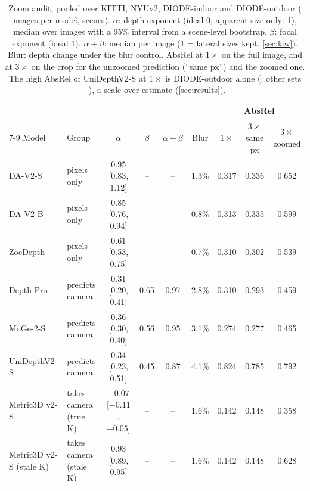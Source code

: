 \begin{table}[t]\centering\small
\caption{Zoom audit, pooled over KITTI, NYUv2, DIODE-indoor and DIODE-outdoor (\nImages{} images per model, \nScenes{} scenes). $\alpha$: depth exponent (ideal 0; apparent size only: 1), median over images with a 95\% interval from a scene-level bootstrap. $\beta$: focal exponent (ideal 1). $\alpha+\beta$: median per image (1 = lateral sizes kept, \cref{sec:law}). Blur: depth change under the blur control. AbsRel at $1\times$ on the full image, and at $3\times$ on the crop for the unzoomed prediction (``same px'') and the zoomed one. The high AbsRel of UniDepthV2-S at $1\times$ is DIODE-outdoor alone (\udDiodeOutAbsrelOne; other sets \udNyuAbsrelOne--\udDiodeInAbsrelOne), a scale over-estimate (\cref{sec:results}).}
\label{tab:audit}
\setlength{\tabcolsep}{4pt}
\begin{tabular}{llccccccc}\toprule
& & & & & & \multicolumn{3}{c}{AbsRel} \\ \cmidrule(lr){7-9}
Model & Group & $\alpha$ & $\beta$ & $\alpha+\beta$ & Blur & $1\times$ & $3\times$ same px & $3\times$ zoomed \\ \midrule
DA-V2-S & pixels only & 0.95 [0.83, 1.12] & -- & -- & 1.3\% & 0.317 & 0.336 & 0.652 \\
DA-V2-B & pixels only & 0.85 [0.76, 0.94] & -- & -- & 0.8\% & 0.313 & 0.335 & 0.599 \\
ZoeDepth & pixels only & 0.61 [0.53, 0.75] & -- & -- & 0.7\% & 0.310 & 0.302 & 0.539 \\
Depth Pro & predicts camera & 0.31 [0.20, 0.41] & 0.65 & 0.97 & 2.8\% & 0.310 & 0.293 & 0.459 \\
MoGe-2-S & predicts camera & 0.36 [0.30, 0.40] & 0.56 & 0.95 & 3.1\% & 0.274 & 0.277 & 0.465 \\
UniDepthV2-S & predicts camera & 0.34 [0.23, 0.51] & 0.45 & 0.87 & 4.1\% & 0.824 & 0.785 & 0.792 \\
Metric3D v2-S & takes camera (true K) & \ensuremath{-0.07} [\ensuremath{-0.11}, \ensuremath{-0.05}] & -- & -- & 1.6\% & 0.142 & 0.148 & 0.358 \\
Metric3D v2-S (stale K) & takes camera (stale K) & 0.93 [0.89, 0.95] & -- & -- & 1.6\% & 0.142 & 0.148 & 0.628 \\
\bottomrule\end{tabular}\end{table}
